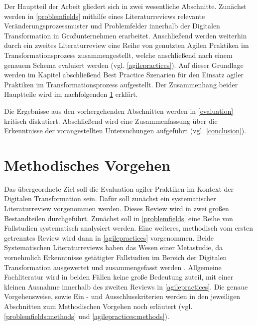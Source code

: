 Der Hauptteil der Arbeit gliedert sich in zwei wesentliche Abschnitte. Zunächst werden in \ref{problemfields} mithilfe eines Literaturreviews relevante Veränderungsprozessmuster und Problemfelder innerhalb der Digitalen Transformation in Großunternehmen erarbeitet. Anschließend werden weiterhin durch ein zweites Literaturreview eine Reihe von genutzten Agilen Praktiken im Transformationsprozess zusammengestellt, welche anschließend nach einem genauem Schema evaluiert werden (vgl. \ref{agilepractices}). Auf dieser Grundlage werden im Kapitel abschließend Best Practice Szenarien für den Einsatz agiler Praktiken im Transformationsprozess aufgestellt. Der Zusammenhang beider Hauptteile wird im nachfolgenden \ref{introduction:methods} erklärt.

Die Ergebnisse aus den vorhergehenden Abschnitten werden in \ref{evaluation} kritisch diskutiert. Abschließend wird eine Zusammenfassung über die Erkenntnisse der vorangestellten Untersuchungen aufgeführt (vgl. \ref{conclusion}).


\section{Methodisches Vorgehen}
\label{introduction:methods}


Das übergeordnete Ziel soll die Evaluation agiler Praktiken im Kontext der Digitalen Transformation sein. Dafür soll zunächst ein systematischer Literaturreview vorgenommen werden. Dieses Review wird in zwei großen Bestandteilen durchgeführt. Zunächst soll in \ref{problemfields} eine Reihe von Fallstudien systematisch analysiert werden. Eine weiteres, methodisch vom ersten getrenntes  Review wird dann in \ref{agilepractices} vorgenommen. Beide Systematischen Literaturreviews haben das Wesen einer Metastudie, da vornehmlich Erkenntnisse getätigter Fallstudien im Bereich der Digitalen Transformation ausgewertet und zusammengefasst werden  . Allgemeine Fachliteratur wird in beiden Fällen keine große Bedeutung zuteil, mit einer kleinen Ausnahme innerhalb des zweiten Reviews in \ref{agilepractices}. Die genaue Vorgehensweise, sowie Ein - und Ausschlusskriterien werden in den jeweiligen Abschnitten zum Methodischen Vorgehen noch erläutert (vgl. \ref{problemfields:methods} und \ref{agilepractices:methods}).

